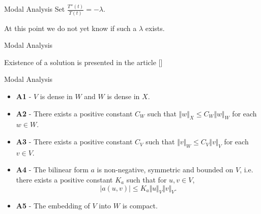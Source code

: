 \documentclass[8pt]{beamer}
\begin{document}
        \begin{frame}{Modal Analysis}
            Set $\displaystyle \frac{T''(t)}{T(t)} = -\lambda$.
        
            At this point we do not yet know if such a $\lambda$ exists.
        
        
         \end{frame}
        
        
         \begin{frame}{Modal Analysis}
        
            Existence of a solution is presented in the article [\cite{CVV18}]
        
        \end{frame}
        
        
        \begin{frame}{Modal Analysis}
            \begin{itemize}
                \item[] \textbf{A1} - $V$ is dense in $W$ and $W$ is dense in $X$.
            
                \item[] \textbf{A2} - There exists a positive constant $C_{W}$ such that $\Vert w\Vert_{X} \leq C_{W}\Vert w\Vert_{W}$ for each $ w\in W$.
            
                \item[] \textbf{A3} - There exists a positive constant $C_{V}$ such that $\Vert v\Vert_{W} \leq C_{V}\Vert v\Vert_{V}$ for each $v \in V$.
            
                \item[] \textbf{A4} - The bilinear form $a$ is non-negative, symmetric and bounded on $V$, i.e. there exists a positive constant $K_a$ such that for $\displaystyle u,v \in V$, \[|a(u,v)| \leq K_a\Vert u \Vert_V \Vert v \Vert_V.\]
        
                \item[] \textbf{A5} - The embedding of $V$ into $W$ is compact.
            \end{itemize}
         \end{frame}
        
\end{document}
